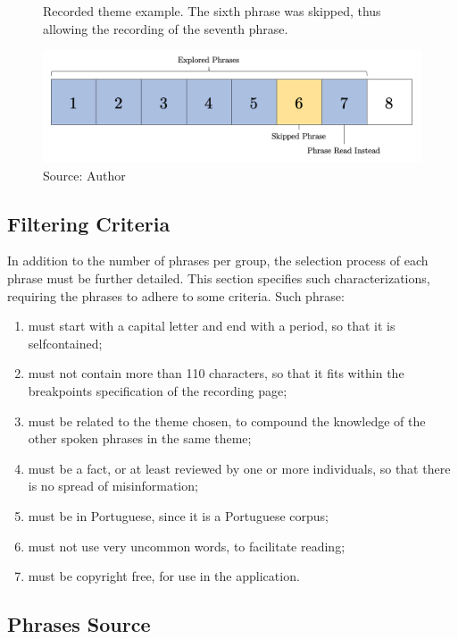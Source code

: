 \begin{figure}[h]
    \centering
    \caption{Recorded theme example. The sixth phrase was skipped, thus allowing the recording of the seventh phrase.}
    \label{fig:falealgumacoisa-phrase-skip}
    \includegraphics[width=\linewidth]{images/phrase-selection/phrase-skip.png}
    \caption*{Source: Author}
\end{figure}

\subsection{Filtering Criteria}

In addition to the number of phrases per group, the selection process of each phrase must be further detailed. This section specifies such characterizations, requiring the phrases to adhere to some criteria. Such phrase:

\begin{enumerate}
    \item must start with a capital letter and end with a period, so that it is selfcontained;
    \item must not contain more than 110 characters, so that it fits within the breakpoints specification of the recording page;
    \item must be related to the theme chosen, to compound the knowledge of the other spoken phrases in the same theme;
    \item must be a fact, or at least reviewed by one or more individuals, so that there is no spread of misinformation;
    \item must be in Portuguese, since it is a Portuguese corpus;
    \item must not use very uncommon words, to facilitate reading;
    \item must be copyright free, for use in the application.
\end{enumerate}

\subsection{Phrases Source}

